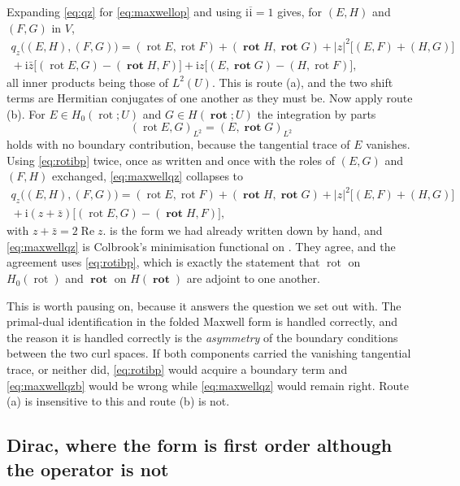 \documentclass[11pt,a4paper]{article}
\theoremstyle{plain}
\newcommand{\abs}[1]{\left|#1\right|}
\newcommand{\Vb}{V}
\newcommand{\ii}{\mathrm{i}}
\DeclareMathOperator{\Real}{Re}
\DeclareMathOperator{\rot}{rot}
\DeclareMathOperator{\Rot}{\mathbf{rot}}
\begin{document}
Expanding \cref{eq:qz} for \cref{eq:maxwellop} and using $\ii\overline{\ii} = 1$
gives, for $(E,H)$ and $(F,G)$ in $\Vb$,
\begin{multline}
  \label{eq:maxwellqz}
  q_z\bigl((E,H),(F,G)\bigr)
    = (\rot E, \rot F) + (\Rot H, \Rot G)
      + \abs{z}^2\bigl[(E,F) + (H,G)\bigr] \\
      {} + \ii\bar z\bigl[(\rot E, G) - (\Rot H, F)\bigr]
      + \ii z\bigl[(E, \Rot G) - (H, \rot F)\bigr],
\end{multline}
all inner products being those of $L^2(U)$.  This is route (a), and the two
shift terms are Hermitian conjugates of one another as they must be.  Now apply
route (b).  For $E \in H_0(\rot;U)$ and $G \in H(\Rot;U)$ the integration by
parts
\begin{equation}
  \label{eq:rotibp}
  (\rot E, G)_{L^2} = (E, \Rot G)_{L^2}
\end{equation}
holds with no boundary contribution, because the tangential trace of $E$
vanishes.  Using \cref{eq:rotibp} twice, once as written and once with the roles
of $(E,G)$ and $(F,H)$ exchanged, \cref{eq:maxwellqz} collapses to
\begin{multline}
  \label{eq:maxwellqzb}
  q_z\bigl((E,H),(F,G)\bigr)
    = (\rot E, \rot F) + (\Rot H, \Rot G)
      + \abs{z}^2\bigl[(E,F) + (H,G)\bigr] \\
      {} + \ii(z + \bar z)\bigl[(\rot E, G) - (\Rot H, F)\bigr] ,
\end{multline}
with $z + \bar z = 2\Real z$.   is the form we had already
written down by hand, and \cref{eq:maxwellqz} is Colbrook's minimisation
functional on \cite[p.~132]{Colbrook2026}.  They agree, and the agreement uses
\cref{eq:rotibp}, which is exactly the statement that $\rot$ on $H_0(\rot)$ and
$\Rot$ on $H(\Rot)$ are adjoint to one another.

This is worth pausing on, because it answers the question we set out with.  The
primal-dual identification in the folded Maxwell form is handled correctly, and
the reason it is handled correctly is the \emph{asymmetry} of the boundary
conditions between the two curl spaces.  If both components carried the
vanishing tangential trace, or neither did, \cref{eq:rotibp} would acquire a
boundary term and \cref{eq:maxwellqzb} would be wrong while
\cref{eq:maxwellqz} would remain right.  Route (a) is insensitive to this and
route (b) is not.

\subsection{Dirac, where the form is first order although the operator is not}
\label{sec:dirac}
\end{document}
